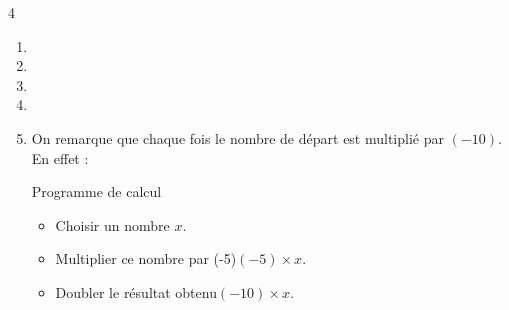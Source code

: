 \begin{corrige}
    \phantom{rrr}    
    \begin{multicols}4
        \begin{enumerate}
            \item {}            
            \item {}            
            \item {}            
            \item {}
        \end{enumerate}
    \end{multicols}
        \begin{enumerate}
            \setcounter{enumi}{4}
            \item On remarque que chaque fois le nombre de départ est multiplié par $(-10)$. En effet :
            \begin{myProgCalculBox}{Programme de calcul}
                \begin{itemize}
                    \item Choisir un nombre \dotfill $x$.
                    \item Multiplier ce nombre par (-5)\dotfill $(-5)\times x $.
                    \item Doubler le résultat obtenu\dotfill $(-10)\times x$.
                \end{itemize}
            \end{myProgCalculBox}        
        \end{enumerate}
\end{corrige}